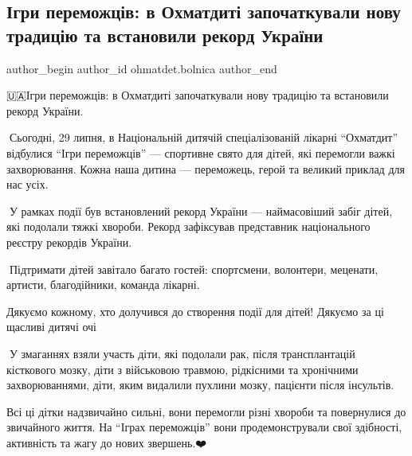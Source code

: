  
 
 
 
 

\subsection{Ігри переможців: в Охматдиті започаткували нову традицію та встановили рекорд України}
\label{sec:29_07_2023.fb.ohmatdet.bolnica.1.igry_peremozhciv}

\ifcmt
 author_begin
   author_id ohmatdet.bolnica
 author_end
\fi

🇺🇦Ігри переможців: в Охматдиті започаткували нову традицію та встановили рекорд України. 

🔹Сьогодні, 29 липня, в Національній  дитячій спеціалізованій лікарні
\enquote{Охматдит} відбулися \enquote{Ігри переможців} — спортивне свято для дітей, які
перемогли важкі захворювання. Кожна наша дитина — переможець, герой та великий
приклад для нас усіх. 

🔸У рамках події був встановлений рекорд України — наймасовіший забіг дітей,
які подолали тяжкі хвороби. Рекорд зафіксував представник національного реєстру
рекордів України.💙💛

🔹Підтримати дітей завітало багато гостей: спортсмени, волонтери, меценати, артисти, благодійники, команда лікарні. 

Дякуємо кожному, хто долучився до створення події для дітей! Дякуємо за ці щасливі дитячі очі 🙏

🔸У змаганнях взяли участь діти, які подолали рак, після трансплантацій
кісткового мозку, діти з військовою травмою, рідкісними та хронічними
захворюваннями, діти, яким видалили пухлини мозку, пацієнти після інсультів. 

Всі ці дітки надзвичайно сильні, вони перемогли різні хвороби та повернулися до
звичайного життя. На \enquote{Іграх переможців} вони продемонстрували свої здібності,
активність та жагу до нових звершень.❤️

